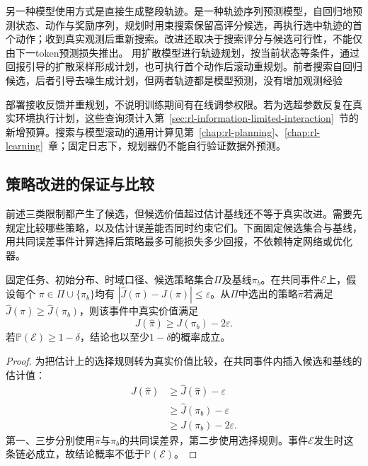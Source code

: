 另一种模型使用方式是直接生成整段轨迹。是一种轨迹序列预测模型，自回归地预测状态、动作与奖励序列，规划时用束搜索保留高评分候选，再执行选中轨迹的首个动作；收到真实观测后重新搜索。改进还取决于搜索评分与候选可行性，不能仅由下一token预测损失推出。
用扩散模型进行轨迹规划，按当前状态等条件，通过回报引导的扩散采样形成计划，也可执行首个动作后滚动重规划。前者搜索自回归候选，后者引导去噪生成计划，但两者轨迹都是模型预测，没有增加观测经验

部署接收反馈并重规划，不说明训练期间有在线调参权限。若为选超参数反复在真实环境执行计划，这些查询须计入第~\ref{sec:rl-information-limited-interaction}~节的新增预算。搜索与模型滚动的通用计算见第~\ref{chap:rl-planning}、\ref{chap:rl-learning}~章；固定日志下，规划器仍不能自行验证数据外预测。

\subsection{策略改进的保证与比较}
\label{sec:rl-information-improvement}

前述三类限制都产生了候选，但候选价值超过估计基线还不等于真实改进。需要先规定比较哪些策略，以及估计误差能否同时约束它们。下面固定候选集合与基线，用共同误差事件计算选择后策略最多可能损失多少回报，不依赖特定网络或优化器。

\begin{theorem}[共同误差事件上的基线性能控制]
  \label{thm:rl-information-improvement}
  固定任务、初始分布、时域口径、候选策略集合$\Pi$及基线$\pi_b$。在共同事件$\mathcal E$上，假设每个
  $\pi\in\Pi\cup\{\pi_b\}$均有
  $|\widehat J(\pi)-J(\pi)|\leq\varepsilon$。从$\Pi$中选出的策略$\widehat\pi$若满足
  $\widehat J(\widehat\pi)\geq\widehat J(\pi_b)$，则该事件中真实价值满足
  \[
    J(\widehat\pi)\geq J(\pi_b)-2\varepsilon.
  \]
  若$\mathbb P(\mathcal E)\geq1-\delta$，结论也以至少$1-\delta$的概率成立。
\end{theorem}

\begin{proof}
  为把估计上的选择规则转为真实价值比较，在共同事件内插入候选和基线的估计值：
  \[
  \begin{aligned}
    J(\widehat\pi)
    &\geq\widehat J(\widehat\pi)-\varepsilon\\
    &\geq\widehat J(\pi_b)-\varepsilon\\
    &\geq J(\pi_b)-2\varepsilon.
  \end{aligned}
  \]
  第一、三步分别使用$\widehat\pi$与$\pi_b$的共同误差界，第二步使用选择规则。事件$\mathcal E$发生时这条链必成立，故结论概率不低于$\mathbb P(\mathcal E)$。
\end{proof}

